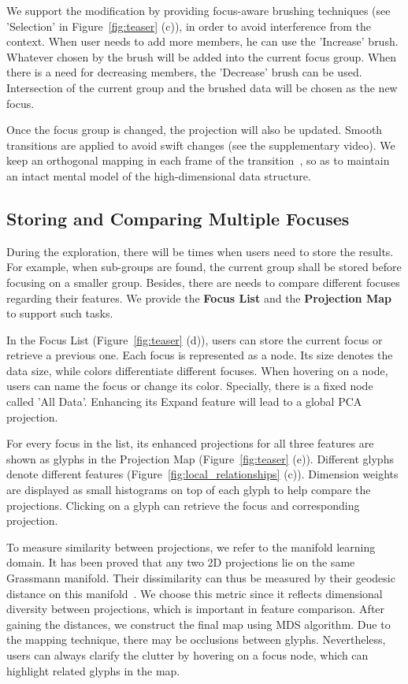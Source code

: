 We support the modification by providing focus-aware brushing techniques (see 'Selection' in Figure~\ref{fig:teaser} (c)), in order to avoid interference from the context. When user needs to add more members, he can use the 'Increase' brush. Whatever chosen by the brush will be added into the current focus group. When there is a need for decreasing members, the 'Decrease' brush can be used. Intersection of the current group and the brushed data will be chosen as the new focus.

Once the focus group is changed, the projection will also be updated. Smooth transitions are applied to avoid swift changes (see the supplementary video). We keep an orthogonal mapping in each frame of the transition~\cite{cook2004computational}, so as to maintain an intact mental model of the high-dimensional data structure.

\subsection{Storing and Comparing Multiple Focuses}
During the exploration, there will be times when users need to store the results. For example, when sub-groups are found, the current group shall be stored before focusing on a smaller group. Besides, there are needs to compare different focuses regarding their features. We provide the \textbf{Focus List} and the \textbf{Projection Map} to support such tasks.

In the Focus List (Figure~\ref{fig:teaser} (d)), users can store the current focus or retrieve a previous one. Each focus is represented as a node. Its size denotes the data size, while colors differentiate different focuses. When hovering on a node, users can name the focus or change its color. Specially, there is a fixed node called 'All Data'. Enhancing its Expand feature will lead to a global PCA projection.

For every focus in the list, its enhanced projections for all three features are shown as glyphs in the Projection Map (Figure~\ref{fig:teaser} (e)). Different glyphs denote different features (Figure~\ref{fig:local_relationships} (c)). Dimension weights are displayed as small histograms on top of each glyph to help compare the projections. Clicking on a glyph can retrieve the focus and corresponding projection.

To measure similarity between projections, we refer to the manifold learning domain. It has been proved that any two 2D projections lie on the same Grassmann manifold. Their dissimilarity can thus be measured by their geodesic distance on this manifold~\cite{absil2004riemannian}. We choose this metric since it reflects dimensional diversity between projections, which is important in feature comparison. After gaining the distances, we construct the final map using MDS algorithm. Due to the mapping technique, there may be occlusions between glyphs. Nevertheless, users can always clarify the clutter by hovering on a focus node, which can highlight related glyphs in the map.

